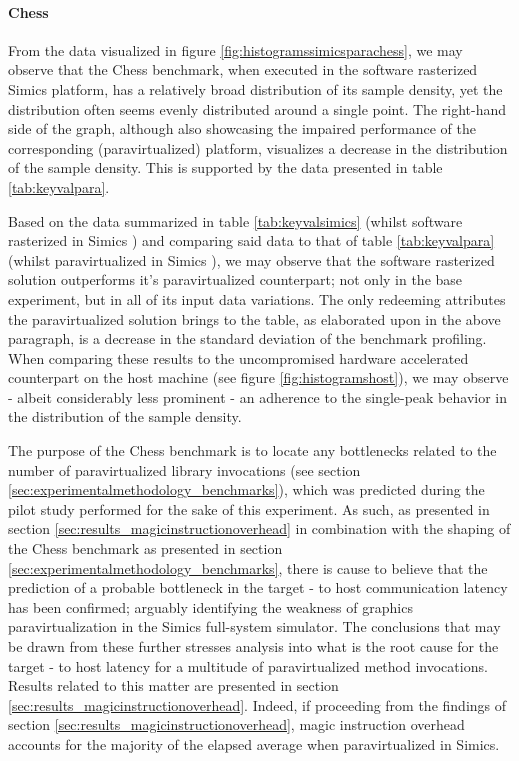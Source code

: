 \paragraph{Chess}
\label{par:results_chess}
From the data visualized in figure \ref{fig:histogramssimicsparachess}, we may observe that the Chess benchmark, when executed in the software rasterized Simics platform, has a relatively broad distribution of its sample density, yet the distribution often seems evenly distributed around a single point.
The right-hand side of the graph, although also showcasing the impaired performance of the corresponding (paravirtualized) platform, visualizes a decrease in the distribution of the sample density.
This is supported by the data presented in table \ref{tab:keyvalpara}.

Based on the data summarized in table \ref{tab:keyvalsimics} (whilst software rasterized in Simics ) and comparing said data to that of table \ref{tab:keyvalpara} (whilst paravirtualized in Simics ), we may observe that the software rasterized solution outperforms it's paravirtualized counterpart; not only in the base experiment, but in all of its input data variations.
The only redeeming attributes the paravirtualized solution brings to the table, as elaborated upon in the above paragraph, is a decrease in the standard deviation of the benchmark profiling.
When comparing these results to the uncompromised hardware accelerated counterpart on the host machine (see figure \ref{fig:histogramshost}), we may observe - albeit considerably less prominent - an adherence to the single-peak behavior in the distribution of the sample density.

The purpose of the Chess benchmark is to locate any bottlenecks related to the number of paravirtualized library invocations (see section \ref{sec:experimentalmethodology_benchmarks}), which was predicted during the pilot study performed for the sake of this experiment.
As such, as presented in section \ref{sec:results_magicinstructionoverhead} in combination with the shaping of the Chess benchmark as presented in section \ref{sec:experimentalmethodology_benchmarks}, there is cause to believe that the prediction of a probable bottleneck in the target - to host communication latency has been confirmed; arguably identifying the weakness of graphics paravirtualization in the Simics full-system simulator.
The conclusions that may be drawn from these further stresses analysis into what is the root cause for the target - to host latency for a multitude of paravirtualized method invocations.
Results related to this matter are presented in section \ref{sec:results_magicinstructionoverhead}. 
Indeed, if proceeding from the findings of section \ref{sec:results_magicinstructionoverhead}, magic instruction overhead accounts for the majority of the elapsed average when paravirtualized in Simics.

